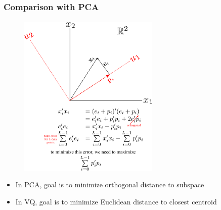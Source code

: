 \begin{frame}
\frametitle{Comparison with PCA}
\framesubtitle{}
\logoCSIPCPL\mypagenum
\begin{figure}		
\includegraphics[width=0.6\textwidth]{thesis/PRML_PCA_geometricDerivation_step1.pdf}			
\end{figure}
\begin{itemize}
\item In PCA, goal is to minimize orthogonal distance to subspace
\item In VQ, goal is to minimize Euclidean distance to closest centroid
\end{itemize}
\end{frame}







